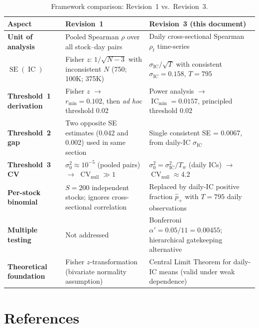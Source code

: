 \documentclass[11pt,a4paper]{article}
\theoremstyle{definition}
\newcommand{\IC}{\operatorname{IC}}
\newcommand{\SE}{\operatorname{SE}}
\newcommand{\CV}{\operatorname{CV}}
\begin{document}
\begin{table}[htbp]
\centering
\caption{Framework comparison: Revision~1 vs.\ Revision~3.}
\label{tab:comparison}
\begin{tabular}{p{3.5cm}p{3.8cm}p{3.8cm}}
\toprule
Aspect & Revision~1 & Revision~3 (this document) \\
\midrule
\textbf{Unit of analysis} &
  Pooled Spearman $\rho$ over all stock--day pairs &
  Daily cross-sectional Spearman $\rho_{t}$ time-series \\

\textbf{$\SE(\IC)$} &
  Fisher $z$: $1/\sqrt{N-3}$ with inconsistent $N$ (750; 100K; 375K) &
  $\sigma_{\IC}/\sqrt{T}$ with consistent $\sigma_{\IC}=0.158$, $T=795$ \\

\textbf{Threshold~1 derivation} &
  Fisher $z$ $\to$ $r_{\min}=0.102$, then \emph{ad hoc} threshold $0.02$ &
  Power analysis $\to$ $\IC_{\min}=0.0157$, principled threshold $0.02$ \\

\textbf{Threshold~2 gap} &
  Two opposite SE estimates (0.042 and 0.002) used in same section &
  Single consistent SE = 0.0067, from daily-IC $\sigma_{\IC}$ \\

\textbf{Threshold~3 CV} &
  $\sigma_{0}^{2}\approx 10^{-5}$ (pooled pairs) $\to$ $\CV_{\text{null}} \gg 1$ &
  $\sigma_{0}^{2} = \sigma_{\IC}^{2}/T_{w}$ (daily ICs) $\to$ $\CV_{\text{null}} \approx 4.2$ \\

\textbf{Per-stock binomial} &
  $S=200$ independent stocks; ignores cross-sectional correlation &
  Replaced by daily-IC positive fraction $\hat{p}_{+}$ with $T=795$ daily observations \\

\textbf{Multiple testing} &
  Not addressed &
  Bonferroni $\alpha'=0.05/11=0.00455$; hierarchical gatekeeping alternative \\

\textbf{Theoretical foundation} &
  Fisher $z$-transformation (bivariate normality assumption) &
  Central Limit Theorem for daily-IC means (valid under weak dependence) \\
\bottomrule
\end{tabular}
\end{table}

\section*{References}
\end{document}
